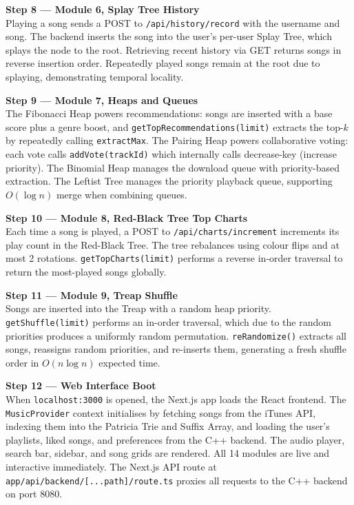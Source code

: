 \documentclass[12pt, a4paper]{article}
\begin{document}
\textbf{Step 8 --- Module 6, Splay Tree History}\\
Playing a song sends a POST to \texttt{/api/history/record} with the username and song. The backend inserts the song into the user's per-user Splay Tree, which splays the node to the root. Retrieving recent history via GET returns songs in reverse insertion order. Repeatedly played songs remain at the root due to splaying, demonstrating temporal locality.

\textbf{Step 9 --- Module 7, Heaps and Queues}\\
The Fibonacci Heap powers recommendations: songs are inserted with a base score plus a genre boost, and \texttt{getTopRecommendations(limit)} extracts the top-$k$ by repeatedly calling \texttt{extractMax}. The Pairing Heap powers collaborative voting: each vote calls \texttt{addVote(trackId)} which internally calls decrease-key (increase priority). The Binomial Heap manages the download queue with priority-based extraction. The Leftist Tree manages the priority playback queue, supporting $O(\log n)$ merge when combining queues.

\textbf{Step 10 --- Module 8, Red-Black Tree Top Charts}\\
Each time a song is played, a POST to \texttt{/api/charts/increment} increments its play count in the Red-Black Tree. The tree rebalances using colour flips and at most 2 rotations. \texttt{getTopCharts(limit)} performs a reverse in-order traversal to return the most-played songs globally.

\textbf{Step 11 --- Module 9, Treap Shuffle}\\
Songs are inserted into the Treap with a random heap priority. \texttt{getShuffle(limit)} performs an in-order traversal, which due to the random priorities produces a uniformly random permutation. \texttt{reRandomize()} extracts all songs, reassigns random priorities, and re-inserts them, generating a fresh shuffle order in $O(n \log n)$ expected time.

\textbf{Step 12 --- Web Interface Boot}\\
When \texttt{localhost:3000} is opened, the Next.js app loads the React frontend. The \texttt{MusicProvider} context initialises by fetching songs from the iTunes API, indexing them into the Patricia Trie and Suffix Array, and loading the user's playlists, liked songs, and preferences from the C++ backend. The audio player, search bar, sidebar, and song grids are rendered. All 14 modules are live and interactive immediately. The Next.js API route at \texttt{app/api/backend/[...path]/route.ts} proxies all requests to the C++ backend on port 8080.
\end{document}
